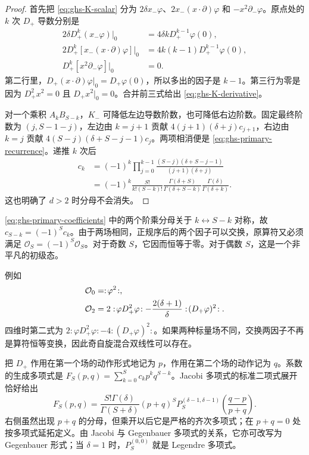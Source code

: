 \begin{proof}
首先把 \cref{eq:ghs-K-scalar} 分为 $2\delta x_-\varphi$、$2x_-(x\cdot\partial)\varphi$ 和 $-x^2\partial_-\varphi$。原点处的 $k$ 次 $D_+$ 导数分别是
\begin{align*}
2\delta D_+^k(x_-\varphi)|_0&=4\delta k D_+^{k-1}\varphi(0),\\
2D_+^k[x_-(x\cdot\partial)\varphi]|_0
&=4k(k-1)D_+^{k-1}\varphi(0),\\
D_+^k[x^2\partial_-\varphi]|_0&=0.
\end{align*}
第二行里，$D_+(x\cdot\partial)\varphi|_0=D_+\varphi(0)$，所以多出的因子是 $k-1$。第三行为零是因为 $D_+^2x^2=0$ 且 $D_+x^2|_0=0$。合并前三式给出 \cref{eq:ghs-K-derivative}。

对一个乘积 $A_kB_{S-k}$，$K_-$ 可降低左边导数阶数，也可降低右边阶数。固定最终阶数为 $(j,S-1-j)$，左边由 $k=j+1$ 贡献 $4(j+1)(\delta+j)c_{j+1}$，右边由 $k=j$ 贡献 $4(S-j)(\delta+S-j-1)c_j$。两项相消便是 \cref{eq:ghs-primary-recurrence}。递推 $k$ 次后
\begin{align*}
c_k&=(-1)^k\prod_{j=0}^{k-1}\frac{(S-j)(\delta+S-j-1)}{(j+1)(\delta+j)}\\
&=(-1)^k\frac{S!}{k!(S-k)!}\frac{\Gamma(\delta+S)}{\Gamma(\delta+S-k)}
\frac{\Gamma(\delta)}{\Gamma(\delta+k)}.
\end{align*}
这也明确了 $d>2$ 时分母不会消失。
\end{proof}

\cref{eq:ghs-primary-coefficients} 中的两个阶乘分母关于 $k\leftrightarrow S-k$ 对称，故 $c_{S-k}=(-1)^S c_k$。由于两场相同，正规序后的两个因子可以交换，原算符又必须满足 $\mathcal O_S=(-1)^S\mathcal O_S$。对于奇数 $S$，它因而恒等于零。对于偶数 $S$，这是一个非平凡的初级态。

例如
\begin{align}\label{eq:ghs-spin-two-current}
 \mathcal O_0&=:\!\varphi^2\!:,\\
 \mathcal O_2&=2:\!\varphi D_+^2\varphi\!:
 -\frac{2(\delta+1)}{\delta}:\!(D_+\varphi)^2\!: .\notag
\end{align}
四维时第二式为 $2:\!\varphi D_+^2\varphi\!:-4:\!(D_+\varphi)^2\!:$。如果两种标量场不同，交换两因子不再是算符恒等变换，因此奇自旋混合双线性可以存在。


把 $D_+$ 作用在第一个场的动作形式地记为 $p$，作用在第二个场的动作记为 $q$。系数的生成多项式是 $F_S(p,q)=\sum_{k=0}^S c_kp^kq^{S-k}$。Jacobi 多项式的标准二项式展开恰好给出
\begin{equation}\label{eq:ghs-jacobi-polynomial}
 F_S(p,q)=\frac{S!\Gamma(\delta)}{\Gamma(S+\delta)}
 (p+q)^S P_S^{(\delta-1,\delta-1)}
 \!\left(\frac{q-p}{p+q}\right).
\end{equation}
右侧虽然出现 $p+q$ 的分母，但乘开以后它是严格的齐次多项式；在 $p+q=0$ 处按多项式延拓定义。由 Jacobi 与 Gegenbauer 多项式的关系，它亦可改写为 Gegenbauer 形式；当 $\delta=1$ 时，$P_S^{(0,0)}$ 就是 Legendre 多项式。

